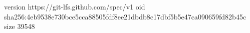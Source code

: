 version https://git-lfs.github.com/spec/v1
oid sha256:4eb9538e730bce5cca88505fdf8ee21dbdb8c17dbf5b5e47ca090659fd82b45c
size 39548
